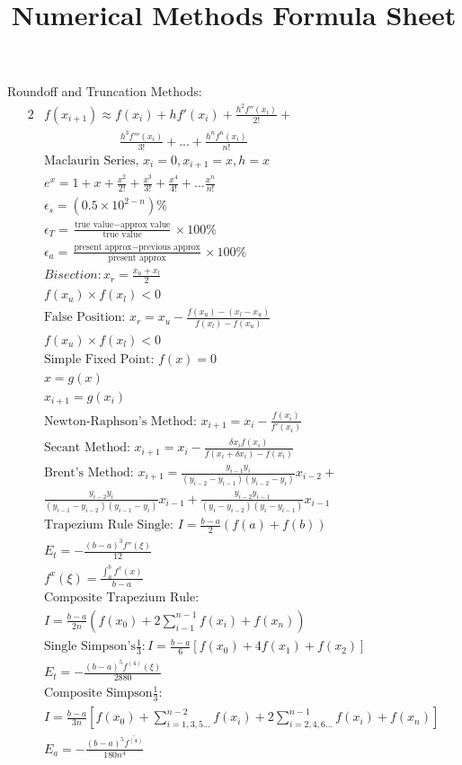 \documentclass[twocolumn]{article}
\title{Numerical Methods Formula Sheet}
\begin{document}
	Roundoff and Truncation Methods:
	\begin{alignat*}{2}
		&f (x_{i+1})  \approx  f(x_i) + hf'(x_i) + \frac{h^2f''(x_i)}{2!} +\\ &\qquad\qquad\qquad\frac{h^3f'''(x_i)}{3!} + ... + \frac{h^nf^n(x_i)}{n!}\\
		&\text{Maclaurin Series, } x_i = 0, x_{i+1} = x,  h=x\\
	&e^x = 1 + x + \frac{x^2}{2!} + \frac{x^3}{3!} + \frac{x^4}{4!} + ... \frac{x^n}{n!}\\
		&\epsilon_s = (0.5 \times 10^{2-n})\%\\
		&\epsilon_T = \frac{\text{true value} - \text{approx value}}{\text{true value}}\times 100\%\\
		&\epsilon_a = \frac{\text{present approx} - \text{previous approx}}{\text{present approx}}\times 100\%\\
		&Bisection: x_r = \frac{x_u + x_l}{2}\\
		&f(x_u) \times f(x_l) < 0\\
		&\text{False Position: }x_r = x_u - \frac{f(x_u) -(x_l-x_u)}{f(x_l)-f(x_u)}\\
		&f(x_u) \times f(x_l) < 0\\
		&\text{Simple Fixed Point: }f(x) = 0\\
		&x = g(x)\\
		&x_{i+1} = g(x_i)\\
		&\text{Newton-Raphson's Method: }x_{i+1} = x_i - \frac{f(x_i)}{f'(x_i)}\\
		&\text{Secant Method: }x_{i+1} = x_i - \frac{\delta x_i f(x_i)}{f(x_i+\delta x_i)-f(x_i)}\\
		&\text{Brent's Method: }x_{i+1} = \frac{y_{i-1}y_i}{(y_{i-2}-y_{i-1})(y_{i-2}-y_i)}x_{i-2} + \\ &\frac{y_{i-2}y_i}{(y_{i-1}-y_{i-2})(y_{i-1}-y_i)}x_{i-1} +  \frac{y_{i-2}y_{i-1}}{(y_{i}-y_{i-2})(y_{i}-y_{i-1})}x_{i-1}\\
		&\text{Trapezium Rule Single: } I = \frac{b-a}{2}(f(a) + f(b))\\
		&E_t = -\frac{(b-a)^3 f''(\xi)}{12}\\
		&f^x(\xi) = \frac{\int_a^b{f^x(x)}}{b-a}\\
		&\text{Composite Trapezium Rule:}\\
		&I = \frac{b-a}{2n}(f(x_0) + 2\sum^{n-1}_{i-1} f(x_i) + f(x_n))\\
		&\text{Single Simpson's}\frac{1}{3}:I = \frac{b-a}{6}[f(x_0)  + 4f(x_1) + f(x_2)]\\
		&E_t = -\frac{(b-a)^5 f^{(4)}(\xi)}{2880}\\
		&\text{Composite Simpson}\frac{1}{3}:\\
		&I = \frac{b-a}{3n}[f(x_0)+\sum^{n-2}_{i=1,3,5...}f(x_i) + 2\sum^{n-1}_{i=2,4,6...}f(x_i) + f(x_n)]\\
		&E_a = -\frac{(b-a)^5 \bar{f^{(4)}}}{180n^4}
	\end{alignat*}
\end{document}
